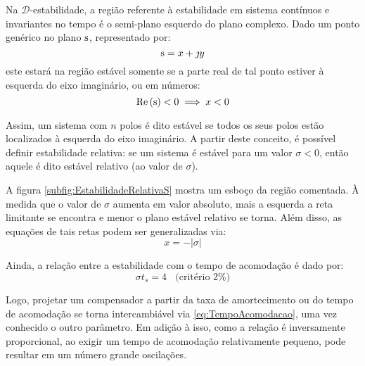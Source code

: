 Na $\mathscr{D}$-estabilidade, a região referente à estabilidade em sistema contínuos e invariantes no tempo é o semi-plano esquerdo do plano complexo. Dado um ponto genérico no plano $\operatorname{\mathrm{s}}$, representado por:
\begin{equation}
  \operatorname{\mathrm{s}} = x + \jmath y\label{eq:PontoGenericoPlanoS}
\end{equation}
este estará na região estável somente se a parte real de tal ponto estiver à esquerda do eixo imaginário, ou em números:
\begin{equation}
  \operatorname{Re}{(\operatorname{\mathrm{s}})} < 0 \implies x < 0 \label{eq:Estabilidade}
\end{equation}

Assim, um sistema com $n$ polos é dito estável se todos os seus polos estão localizados à esquerda do eixo imaginário. A partir deste conceito, é possível definir estabilidade relativa: se um sistema é estável para um valor $\sigma < 0$, então aquele é dito estável relativo (ao valor de $\sigma$).

A figura \ref{subfig:EstabilidadeRelativaS} mostra um esboço da região comentada. À medida que o valor de $\sigma$ aumenta em valor absoluto, mais a esquerda a reta limitante se encontra e menor o plano estável relativo se torna. Além disso, as equações de tais retas podem ser generalizadas via:
\begin{equation}
  x = -|\sigma|\label{eq:Sigma}
\end{equation}

Ainda, a relação entre a estabilidade com o tempo de acomodação é dado por:
\begin{equation}
	\sigma t_s = 4 \,\,\,\,\ \text{(critério 2\%)}\label{eq:TempoAcomodacao}
\end{equation}

Logo, projetar um compensador a partir da taxa de amortecimento ou do tempo de acomodação se torna intercambiável via \eqref{eq:TempoAcomodacao}, uma vez conhecido o outro parâmetro. Em adição à isso, como a relação é inversamente proporcional, ao exigir um tempo de acomodação relativamente pequeno, pode resultar em um número grande oscilações.

